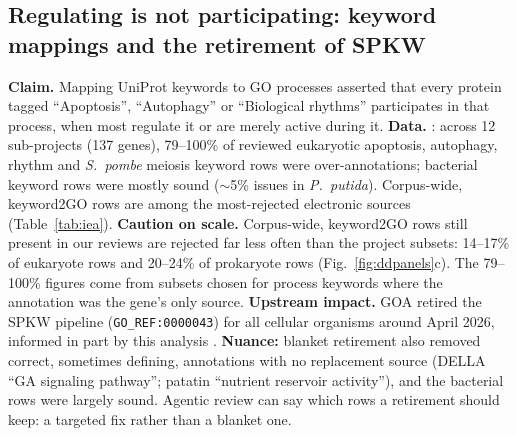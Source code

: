 \subsection{Regulating is not participating: keyword mappings and the retirement of SPKW}\label{sec:dd-kw}
\textbf{Claim.} Mapping UniProt keywords to GO processes asserted that every protein tagged
``Apoptosis'', ``Autophagy'' or ``Biological rhythms'' participates in that process, when most
regulate it or are merely active during it.
\textbf{Data.} : across 12 sub-projects (137 genes), 79--100\% of reviewed eukaryotic
apoptosis, autophagy, rhythm and \textit{S.\ pombe} meiosis keyword rows were over-annotations;
bacterial keyword rows were mostly sound ($\sim$5\% issues in \textit{P.\ putida}). Corpus-wide,
keyword2GO rows are among the most-rejected electronic sources (Table~\ref{tab:iea}).
\textbf{Caution on scale.} Corpus-wide, keyword2GO rows still present in our reviews are rejected far
less often than the project subsets: 14--17\% of eukaryote rows and 20--24\% of prokaryote rows
(Fig.~\ref{fig:ddpanels}c). The 79--100\% figures come from subsets chosen for process keywords
where the annotation was the gene's only source. 
\textbf{Upstream impact.} GOA retired the SPKW pipeline (\texttt{GO\_REF:0000043}) for all cellular
organisms around April 2026, informed in part by this analysis . \textbf{Nuance:} blanket retirement also removed correct, sometimes defining,
annotations with no replacement source (DELLA ``GA signaling pathway''; patatin ``nutrient reservoir
activity''), and the bacterial rows were largely sound. Agentic review can say which rows a
retirement should keep: a targeted fix rather than a blanket one.
